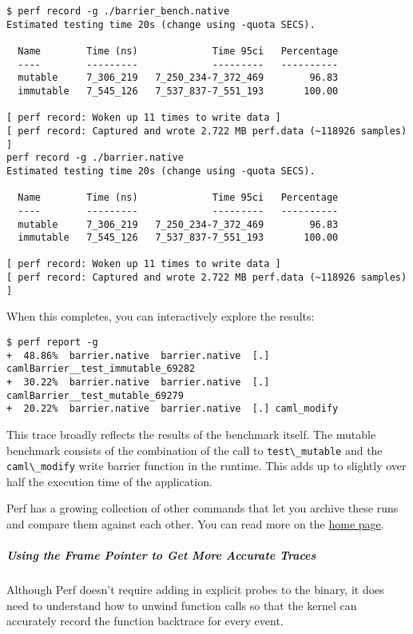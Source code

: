 \begin{lstlisting}
$ perf record -g ./barrier_bench.native
Estimated testing time 20s (change using -quota SECS).

  Name        Time (ns)             Time 95ci   Percentage
  ----        ---------             ---------   ----------
  mutable     7_306_219   7_250_234-7_372_469        96.83
  immutable   7_545_126   7_537_837-7_551_193       100.00

[ perf record: Woken up 11 times to write data ]
[ perf record: Captured and wrote 2.722 MB perf.data (~118926 samples) ]
perf record -g ./barrier.native
Estimated testing time 20s (change using -quota SECS).

  Name        Time (ns)             Time 95ci   Percentage
  ----        ---------             ---------   ----------
  mutable     7_306_219   7_250_234-7_372_469        96.83
  immutable   7_545_126   7_537_837-7_551_193       100.00

[ perf record: Woken up 11 times to write data ]
[ perf record: Captured and wrote 2.722 MB perf.data (~118926 samples) ]
\end{lstlisting}

When this completes, you can interactively explore the results:

\begin{lstlisting}
$ perf report -g
+  48.86%  barrier.native  barrier.native  [.] camlBarrier__test_immutable_69282
+  30.22%  barrier.native  barrier.native  [.] camlBarrier__test_mutable_69279
+  20.22%  barrier.native  barrier.native  [.] caml_modify
\end{lstlisting}

This trace broadly reflects the results of the benchmark itself. The
mutable benchmark consists of the combination of the call to
\passthrough{\lstinline!test\_mutable!} and the
\passthrough{\lstinline!caml\_modify!} write barrier function in the
runtime. This adds up to slightly over half the execution time of the
application.

Perf has a growing collection of other commands that let you archive
these runs and compare them against each other. You can read more on the
\href{http://perf.wiki.kernel.org}{home page}. 

\hypertarget{using-the-frame-pointer-to-get-more-accurate-traces}{%
\subparagraph{Using the Frame Pointer to Get More Accurate
Traces}\label{using-the-frame-pointer-to-get-more-accurate-traces}}

Although Perf doesn't require adding in explicit probes to the binary,
it does need to understand how to unwind function calls so that the
kernel can accurately record the function backtrace for every event.

